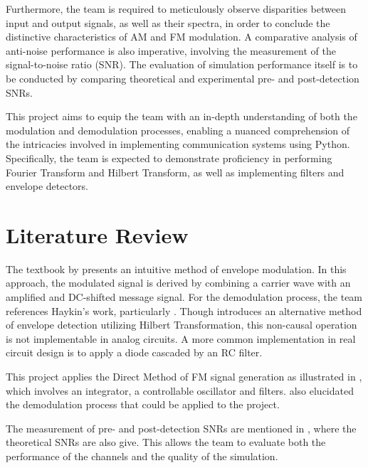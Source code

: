 \documentclass[../ECE459FinalProjectReport.tex]{subfiles}
\begin{document}
Furthermore, the team is required to meticulously observe disparities between input and output signals, as well as their spectra, in order to conclude the distinctive characteristics of AM and FM modulation. A comparative analysis of anti-noise performance is also imperative, involving the measurement of the signal-to-noise ratio (SNR). The evaluation of simulation performance itself is to be conducted by comparing theoretical and experimental pre- and post-detection SNRs.

This project aims to equip the team with an in-depth understanding of both the modulation and demodulation processes, enabling a nuanced comprehension of the intricacies involved in implementing communication systems using Python. Specifically, the team is expected to demonstrate proficiency in performing Fourier Transform and Hilbert Transform, as well as implementing filters and envelope detectors.


\section{Literature Review}

The textbook by \textcite[Sec. 3.1]{haykinIntroductionAnalogDigital2007} presents an intuitive method of envelope modulation. In this approach, the modulated signal is derived by combining a carrier wave with an amplified and DC-shifted message signal. For the demodulation process, the team references Haykin's work, particularly \cite[Fig. 9.8]{haykinIntroductionAnalogDigital2007}. Though \textcite{ulrichEnvelopeCalculationHilbert2006} introduces an alternative method of envelope detection utilizing Hilbert Transformation, this non-causal operation is not implementable in analog circuits. A more common implementation in real circuit design is to apply a diode cascaded by an RC filter.

This project applies the Direct Method of FM signal generation as illustrated in \cite[Fig. 4.7]{haykinIntroductionAnalogDigital2007}, which involves an integrator, a controllable oscillator and filters. \cite[Fig. 9.13]{haykinIntroductionAnalogDigital2007} also elucidated the demodulation process that could be applied to the project.

The measurement of pre- and post-detection SNRs are mentioned in \cite[Sec. 9.5 \& 9.7]{haykinIntroductionAnalogDigital2007}, where the theoretical SNRs are also give. This allows the team to evaluate both the performance of the channels and the quality of the simulation.
\end{document}
